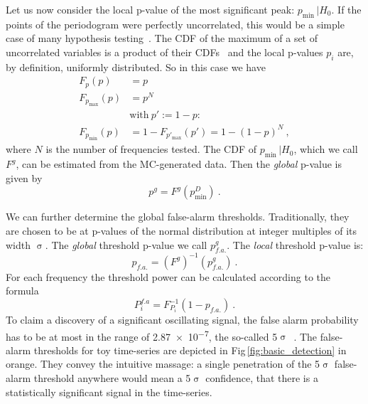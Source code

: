 
Let us now consider the local p-value of the most significant peak: $p_\text{min} \, | H_0$. If the points of the periodogram were perfectly uncorrelated, this would be a simple case of many hypothesis testing~\cite{Algeri2016}. The CDF of the maximum of a set of uncorrelated variables is a product of their CDFs~\cite{Papoulis2002} and the local p-values $p_i$ are, by definition, uniformly distributed. So in this case we have
\begin{align}\label{eq:Fpmin}
  F_p(p) &= p \\
  F_{p_\text{max}}(p) &= p^N \\
  &\text{with}\ p' := 1 - p :\\
  F_{p_\text{min}}(p) &= 1 - F_{p'_\text{max}}(p') = 1 - {(1 - p)}^N \ ,
\end{align}
where $N$ is the number of frequencies tested.
The CDF of $p_\text{min} \, | H_0$, which we call $F^g$, can be estimated from the MC-generated data. Then the \emph{global} p-value is given by
\begin{equation}
  p^g = F^g(p_\text{min}^D) \ .
\end{equation}

We can further determine the global false-alarm thresholds. Traditionally, they are chosen to be at p-values of the normal distribution at integer multiples of its width $\upsigma$. The \emph{global} threshold p-value we call $p^g_{f.a.}$. The \emph{local} threshold p-value is:
\begin{equation}
  p_{f.a.} = {\left( F^g \right)}^{-1}(p^g_{f.a.}) \ .
\end{equation}
For each frequency the threshold power can be calculated according to the formula
\begin{equation}
  P^{f.a}_i = F_{P_i}^{-1}(1 - p_{f.a.}) \ .
\end{equation}
To claim a discovery of a significant oscillating signal, the false alarm probability has to be at most in the range of \num{2.87e-7}, the so-called 5$\upsigma$~\cite{PDG2016}. The false-alarm thresholds for toy time-series are depicted in Fig\,\ref{fig:basic_detection} in orange. They convey the intuitive massage: a single penetration of the 5$\upsigma$ false-alarm threshold anywhere would mean a 5$\upsigma$ confidence, that there is a statistically significant signal in the time-series.

